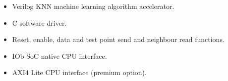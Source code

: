 \begin{itemize}
\item Verilog KNN machine learning algorithm accelerator.
\item C software driver.
\item Reset, enable, data and test point send and neighbour read functions.
\item IOb-SoC native CPU interface.
\item AXI4 Lite CPU interface (premium option).
\end{itemize}
